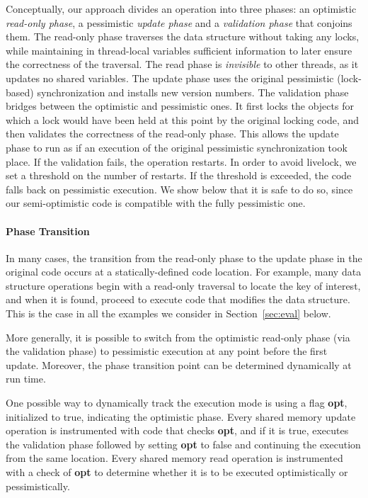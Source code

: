 Conceptually, our approach divides an operation into three phases: an optimistic \emph{read-only phase},
a pessimistic \emph{update phase} and a \emph{validation phase} that conjoins them.
The read-only phase traverses the data structure without taking any locks, while maintaining 
in thread-local variables
sufficient information to later ensure the correctness of the traversal.
The read phase is \emph{invisible} to other threads, as it updates no shared variables.
The update phase uses the original pessimistic (lock-based) synchronization and installs new version numbers.
The validation phase bridges between the optimistic and pessimistic ones.
It first locks the objects for which a lock would have been held at this point by
the original locking code, and then validates the correctness
of the read-only phase. This allows the
update phase to run as if an execution of the original pessimistic synchronization
took place. If the validation fails, the operation
restarts. In order to avoid livelock, we set a threshold on the number of restarts.
If the threshold is exceeded, the code falls back on pessimistic execution.
We show below that
it is safe to do so, since our semi-optimistic code is compatible
with the fully pessimistic one.


\paragraph{Phase Transition}
In many cases, the transition from the read-only phase to the update phase in the original code occurs at a statically-defined code location. For example, many data structure operations begin with a read-only traversal to locate the key of interest, and when it is found, proceed to execute code that modifies the data structure. This is the case in all the examples we consider in Section~\ref{sec:eval} below.

More generally, it is possible to switch from the optimistic read-only phase (via the validation phase) to pessimistic execution at any point before the first update. Moreover, the phase transition point can be determined dynamically at run time.

One possible way to dynamically track the execution mode is using a flag \textbf{opt}, initialized to true, indicating the optimistic phase. 
Every shared memory update operation is instrumented with code that checks \textbf{opt}, and if it is true, executes the validation phase followed by setting \textbf{opt} to false and continuing the execution from the same location. Every shared memory read operation is instrumented with a check of \textbf{opt} to determine whether it is to be executed optimistically or pessimistically. 

